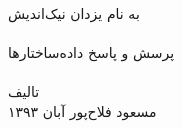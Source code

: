 \begin{titlepage}
\begin{center}
{\nastaliq
به نام یزدان نیک‌اندیش\\
\vspace{10ex}
\hrulefill\\[0.3cm]
{\Huge
پرسش و پاسخ داده‌ساختارها
}\\[0.3cm]
\hrulefill\\
\vfill
تالیف
\\[0.4cm]
مسعود فلاح‌پور
\vfill
آبان ۱۳۹۳
\\[0.3cm]
}

\end{center}
\end{titlepage}